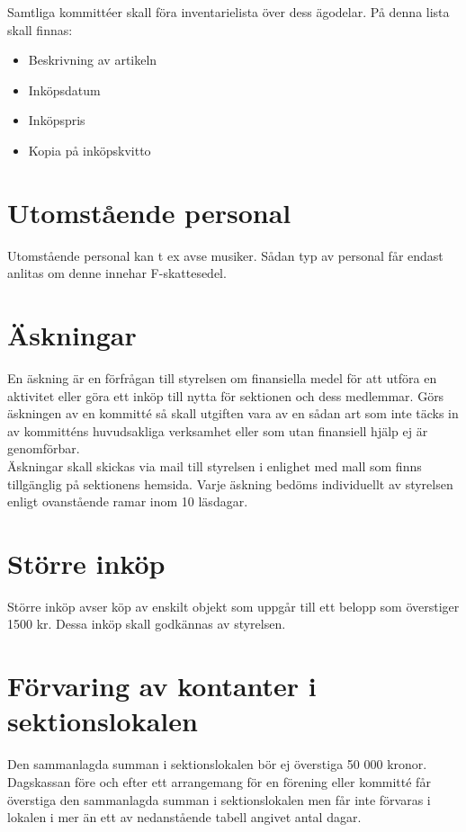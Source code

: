 \documentclass[11pt, includeaddress]{classes/cthit}
\begin{document}
Samtliga kommittéer skall föra inventarielista över dess ägodelar. På denna lista skall finnas:

\begin{itemize}
	\item Beskrivning av artikeln
	\item Inköpsdatum
	\item Inköpspris
	\item Kopia på inköpskvitto
\end{itemize}


\section{Utomstående personal}
Utomstående personal kan t ex avse musiker. Sådan typ av personal får endast anlitas om denne innehar F-skattesedel.

\section{Äskningar}
En äskning är en förfrågan till styrelsen om finansiella medel för att utföra en aktivitet eller göra ett inköp till nytta för sektionen och dess medlemmar. Görs äskningen av en kommitté så skall utgiften vara av en sådan art som inte täcks in av kommitténs huvudsakliga verksamhet eller som utan finansiell hjälp ej är genomförbar. \\

Äskningar skall skickas via mail till styrelsen i enlighet med mall som finns tillgänglig på sektionens hemsida. Varje äskning bedöms individuellt av styrelsen enligt ovanstående ramar inom 10 läsdagar.

\section{Större inköp}
Större inköp avser köp av enskilt objekt som uppgår till ett belopp som överstiger 1500 kr. Dessa inköp skall godkännas av styrelsen.

\section{Förvaring av kontanter i sektionslokalen}
Den sammanlagda summan i sektionslokalen bör ej överstiga 50 000 kronor. \\
Dagskassan före och efter ett arrangemang för en förening eller kommitté får överstiga den sammanlagda summan i sektionslokalen men får inte förvaras i lokalen i mer än ett av nedanstående tabell angivet antal dagar.
\end{document}
